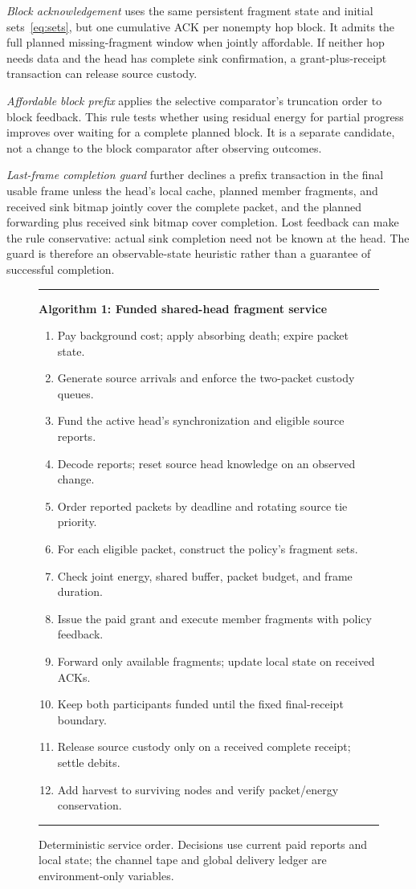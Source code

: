 \documentclass[journal,10pt]{IEEEtran}
\begin{document}
\emph{Block acknowledgement} uses the same persistent fragment state and initial sets~\eqref{eq:sets}, but one cumulative ACK per nonempty hop block. It admits the full planned missing-fragment window when jointly affordable. If neither hop needs data and the head has complete sink confirmation, a grant-plus-receipt transaction can release source custody.

\emph{Affordable block prefix} applies the selective comparator's truncation order to block feedback. This rule tests whether using residual energy for partial progress improves over waiting for a complete planned block. It is a separate candidate, not a change to the block comparator after observing outcomes.

\emph{Last-frame completion guard} further declines a prefix transaction in the final usable frame unless the head's local cache, planned member fragments, and received sink bitmap jointly cover the complete packet, and the planned forwarding plus received sink bitmap cover completion. Lost feedback can make the rule conservative: actual sink completion need not be known at the head. The guard is therefore an observable-state heuristic rather than a guarantee of successful completion.

\begin{figure}[t]
\hrule\vspace{4pt}
\textbf{Algorithm 1: Funded shared-head fragment service}
\begin{enumerate}\setlength\itemsep{1pt}
\item Pay background cost; apply absorbing death; expire packet state.
\item Generate source arrivals and enforce the two-packet custody queues.
\item Fund the active head's synchronization and eligible source reports.
\item Decode reports; reset source head knowledge on an observed change.
\item Order reported packets by deadline and rotating source tie priority.
\item For each eligible packet, construct the policy's fragment sets.
\item Check joint energy, shared buffer, packet budget, and frame duration.
\item Issue the paid grant and execute member fragments with policy feedback.
\item Forward only available fragments; update local state on received ACKs.
\item Keep both participants funded until the fixed final-receipt boundary.
\item Release source custody only on a received complete receipt; settle debits.
\item Add harvest to surviving nodes and verify packet/energy conservation.
\end{enumerate}
\vspace{2pt}\hrule
\caption{Deterministic service order. Decisions use current paid reports and local state; the channel tape and global delivery ledger are environment-only variables.}
\label{fig:algorithm}
\end{figure}
\end{document}
